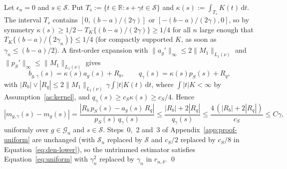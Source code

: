 Let $\epsilon_n=0$ and $s\in\mathcal{S}$.  Put $T_s:=\{t\in\mathbb{R}:s+\gamma t\in\mathcal{S}\}$ and $\kappa(s):=\int_{T_s}K(t)\,\mathrm{d}t$.  The interval $T_s$ contains $[0,(b-a)/(2\gamma)]$ or $[-(b-a)/(2\gamma),0]$, so by symmetry $\kappa(s)\ge1/2-T_K\{(b-a)/(2\gamma)\}\ge1/4$ for all $n$ large enough that $T_K\{(b-a)/(2\gamma_n)\}\le1/4$ (for compactly supported $K$, as soon as $\gamma_n\le(b-a)/2$).  A first-order expansion with $\lVert a_g'\rVert_\infty\le2\lVert M_1\rVert_{L_1(\nu)}$ and $\lVert p_S'\rVert_\infty\le\lVert M_1\rVert_{L_1(\nu)}$ gives
\[
  b_{g,\gamma}(s)=\kappa(s)a_g(s)+R_b,\qquad
  q_\gamma(s)=\kappa(s)p_S(s)+R_q,
\]
with $|R_b|\vee|R_q|\le2\lVert M_1\rVert_{L_1(\nu)}\,\gamma\int|t|K(t)\,\mathrm{d}t$,
where $\int|t|K<\infty$ by Assumption~\ref{as:kernel}, and $q_\gamma(s)\ge c_S\kappa(s)\ge c_S/4$.  Hence
\[
  |m_{g,\gamma}(s)-m_g(s)|
  =\frac{|R_b\,p_S(s)-a_g(s)\,R_q|}{p_S(s)\,q_\gamma(s)}
  \le\frac{|R_b|+2|R_q|}{q_\gamma(s)}
  \le\frac{4\,(|R_b|+2|R_q|)}{c_S}
  \le C\gamma,
\]
uniformly over $g\in\mathcal{G}_n$ and $s\in\mathcal{S}$.  Steps~0,~2 and~3 of Appendix~\ref{app:proof-uniform} are unchanged (with $\mathcal{S}_n$ replaced by $\mathcal{S}$ and $c_S/2$ replaced by $c_S/8$ in Equation~\ref{eq:den-lower}), so the untrimmed estimator satisfies Equation~\ref{eq:uniform} with $\gamma_n^2$ replaced by $\gamma_n$ in $r_{n,\delta}$.
\qed
